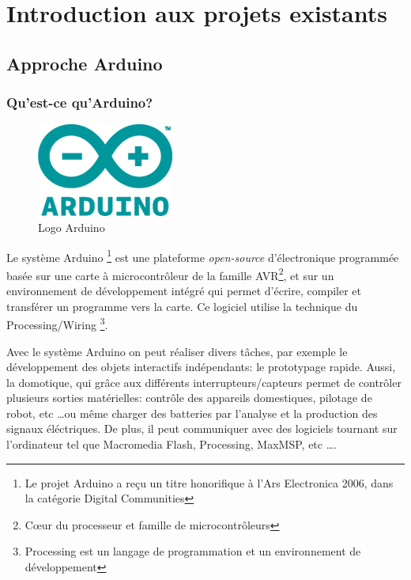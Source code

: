 \part{Introduction aux projets existants}
\chapter[Approche Arduino]{Approche Arduino}
\label{chap:chap2}

\section{Qu'est-ce qu'Arduino?}

\begin{figure}[h]
\begin{center}
\includegraphics[scale=0.4]{figure/Arduino/Arduinologo.png}
\caption{Logo Arduino}
\end{center}
\end{figure}

Le système Arduino \footnote{Le projet Arduino a reçu un titre honorifique à l'Ars Electronica 2006, dans la catégorie Digital Communities} 
est une plateforme \textit{open-source} d'électronique programmée basée sur une carte à microcontrôleur de la famille AVR\footnote{
Cœur du processeur et famille de microcontrôleurs}, et sur un environnement
de développement intégré qui permet d'écrire, compiler et transférer un programme vers la carte. Ce logiciel utilise la technique du Processing/Wiring
\footnote{Processing est un langage de programmation et un environnement de développement}.

Avec le système Arduino on peut réaliser divers tâches, par exemple le développement des objets interactifs indépendants: le prototypage rapide. Aussi,  
la domotique, qui grâce aux différents interrupteurs/capteurs permet de contrôler plusieurs sorties matérielles: contrôle des appareils domestiques, 
pilotage de robot, etc \ldots ou même charger des batteries par l'analyse et la production des signaux éléctriques. 
De plus, il peut communiquer avec des logiciels tournant sur l'ordinateur tel que Macromedia Flash, Processing, MaxMSP, etc \ldots.

